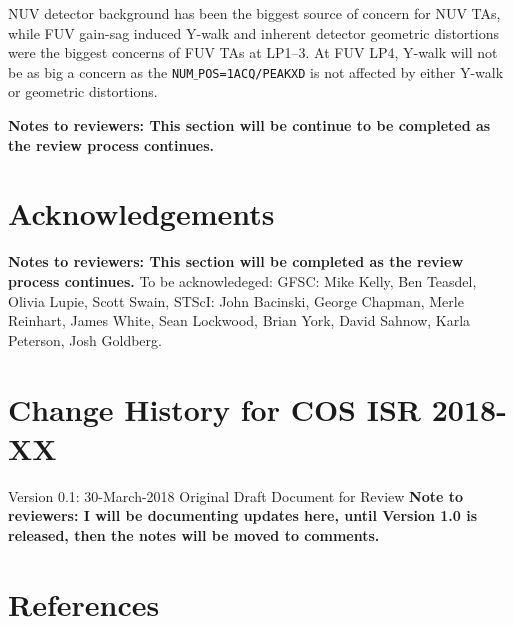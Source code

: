 \documentclass{stsci_report}
\newcommand{\numposone}{\texttt{NUM$\_$POS=1}}
\newcommand{\tacq}[1]{\texttt{ACQ/#1}}
\begin{document}
NUV detector background has been the biggest source of concern
for NUV TAs, while FUV gain-sag induced Y-walk and inherent detector geometric distortions
were the biggest concerns of FUV TAs at LP1--3. At FUV LP4, Y-walk will not be as big a concern as
the \numposone \tacq{PEAKXD} is not affected by either Y-walk or geometric distortions.

{\bf Notes to reviewers: This section will be continue to be completed as the review process continues.}

\clearpage
\vspace{-0.3cm}
\section{Acknowledgements}
{\bf Notes to reviewers: This section will be completed as the review process continues.}
To be acknowledeged:
GFSC: Mike Kelly, Ben Teasdel, Olivia Lupie, Scott Swain,
STScI: John Bacinski, George Chapman, Merle Reinhart, James White, Sean Lockwood, Brian York, David Sahnow, Karla Peterson, Josh Goldberg.

\vspace{-0.3cm}
\vspace{0.3cm}
\section{Change History for COS ISR 2018-XX}\label{sec:History}
\vspace{0.3cm}
Version 0.1: 30-March-2018 Original Draft Document for Review
{\bf Note to reviewers: I will be documenting updates here, until Version 1.0 is released, then the notes
will be moved to comments.}
\vspace{0.3cm}
\section{References}\label{sec:References}
\vspace{0.3cm}
\end{document}
